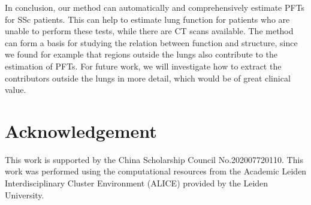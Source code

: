 In conclusion, our method can automatically and comprehensively estimate PFTs for SSc patients. This can help to estimate lung function for patients who are unable to perform these tests, while there are CT scans available. The method can form a basis for studying the relation between function and structure, since we found for example that regions outside the lungs also contribute to the estimation of PFTs. For future work, we will investigate how to extract the contributors outside the lungs in more detail, which would be of great clinical value.

\section*{Acknowledgement}
This work is supported by the China Scholarship Council No.202007720110. This work was performed using the computational resources from the Academic Leiden Interdisciplinary Cluster Environment (ALICE) provided by the Leiden University.



